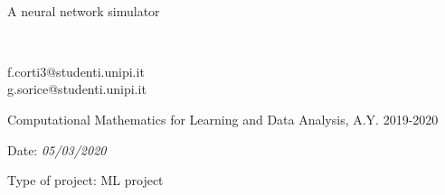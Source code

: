 \documentclass[a4paper, oneside, openany]{article}
\begin{document}
\begin{titlepage}
	\begin{center}
		
		\begin{center}
		\end{center}
		
		\vspace{1cm}
	
		\begin{HUGE}
		
			\textbf{\Titolo{}} \\
		\end{HUGE}
		\vspace{10pt}
		\begin{huge}
		 A neural network simulator
		\end{huge}
		
		\vspace{13pt}  
		
		\begin{large}
		\Gruppo{}\ \\	
		\end{large}
		
		\vspace{5pt}  
		
		\begin{large}
		f.corti3@studenti.unipi.it \\
		g.sorice@studenti.unipi.it \\
		\end{large}
		
		\vspace{5pt}  
		
		\begin{large}
			Computational Mathematics for Learning and Data Analysis, A.Y. 2019-2020 \\
		\end{large}	
		
		\vspace{5pt}
		    
		\begin{large}
			Date: \textit{05/03/2020}		 \\
		\end{large}
		
		\vspace{5pt}
		  		
		\begin{large}
			Type of project: ML project 
		\end{large}	  
		

\end{center}
\end{titlepage}
\end{document}
